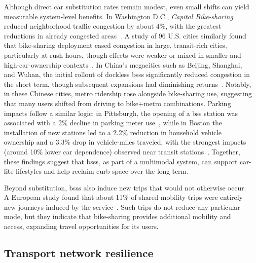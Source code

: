 Although direct car substitution rates remain modest, even small shifts can yield measurable system-level benefits. In Washington D.C., \textit{Capital Bike-sharing} reduced neighborhood traffic congestion by about 4\%, with the greatest reductions in already congested areas~\cite{Hamilton2018}. A study of 96 U.S. cities similarly found that bike-sharing deployment eased congestion in large, transit-rich cities, particularly at rush hours, though effects were weaker or mixed in smaller and high-car-ownership contexts~\cite{Wang2017}. In China’s megacities such as Beijing, Shanghai, and Wuhan, the initial rollout of dockless \acp{bss} significantly reduced congestion in the short term, though subsequent expansions had diminishing returns~\cite{Xu2024}. Notably, in these Chinese cities, metro ridership rose alongside bike-sharing use, suggesting that many users shifted from driving to bike+metro combinations. Parking impacts follow a similar logic: in Pittsburgh, the opening of a \ac{bss} station was associated with a 2\% decline in parking meter use~\cite{Pelechrinis2016}, while in Boston the installation of new stations led to a 2.2\% reduction in household vehicle ownership and a 3.3\% drop in vehicle-miles traveled, with the strongest impacts (around 10\% lower car dependence) observed near transit stations~\cite{Basu2021}. Together, these findings suggest that \acp{bss}, as part of a multimodal system, can support car-lite lifestyles and help reclaim curb space over the long term.

Beyond substitution, \acp{bss} also induce new trips that would not otherwise occur. A European study found that about 11\% of shared mobility trips were entirely new journeys induced by the service~\cite{Bosehans2024}. Such trips do not reduce any particular mode, but they indicate that bike-sharing provides additional mobility and access, expanding travel opportunities for its users. 

    \subsection{Transport network resilience}


